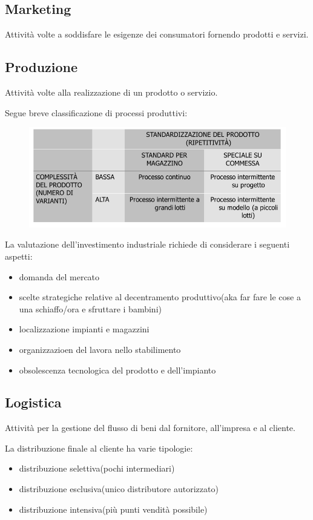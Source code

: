 \subsection{Marketing}
Attività volte a soddisfare le esigenze dei consumatori fornendo prodotti e servizi.

\subsection{Produzione}
Attività volte alla realizzazione di un prodotto o servizio.

Segue breve classificazione di processi produttivi:
\begin{figure}[H]
    \centering
    \includegraphics[width=0.5\linewidth]{1/img/Screenshot from 2022-07-04 14-59-14.png}
\end{figure}


La valutazione dell'investimento industriale richiede di considerare i seguenti aspetti:
\begin{itemize}
    \item domanda del mercato
    \item scelte strategiche relative al decentramento produttivo(aka far fare le cose a una schiaffo/ora e sfruttare i bambini)
    \item localizzazione impianti e magazzini
    \item organizzazioen del lavora nello stabilimento
    \item obsolescenza tecnologica del prodotto e dell'impianto
\end{itemize}

\subsection{Logistica}
Attività per la gestione del flusso di beni dal fornitore, all'impresa e al cliente.


La distribuzione finale al cliente ha varie tipologie:
\begin{itemize}
    \item distribuzione selettiva(pochi intermediari)
    \item distribuzione esclusiva(unico distributore autorizzato)
    \item distribuzione intensiva(più punti vendità possibile)
\end{itemize}


